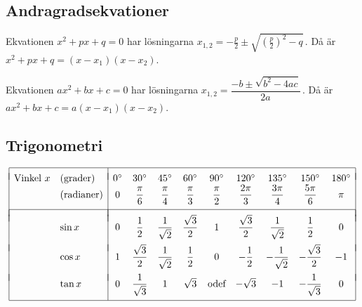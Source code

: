 \documentclass[a4paper]{article}
\begin{document}
\subsection*{Andragradsekvationer}

Ekvationen $x^2+px+q=0$ har lösningarna
  $x_{1,2}=-\frac p2\pm\sqrt{\left(\frac p2\right)^2-q}$\,.
Då är $x^2+px+q=(x-x_1)(x-x_2)$.

\medskip %
Ekvationen $ax^2+bx+c=0$ har lösningarna
$x_{1,2}=\dfrac{-b\pm\sqrt{b^2-4ac}}{2a}$\,.
Då är $ax^2+bx+c=a(x-x_1)(x-x_2)$.


\subsection*{Trigonometri}
\begin{equation*}
  \begin{array}{|ll|ccccccccc|}
    \hline
    &&&&&&&&&&\\*[-7pt]
    \text{Vinkel }x&(\text{grader})&
    0^\circ&30^\circ&45^\circ&60^\circ&90^\circ&
    120^\circ&135^\circ&150^\circ&180^\circ\\
    &(\text{radianer})&
    0&\dfrac\pi6&\dfrac\pi4&\dfrac\pi3&\dfrac\pi2&
    \dfrac{2\pi}3&\dfrac{3\pi}4&\dfrac{5\pi}6&\pi\\*[3pt]
    &&&&&&&&&&\\*[-7pt]
    \hline
    &&&&&&&&&&\\*[-7pt]
    &\sin x&0&\dfrac12&\dfrac1{\sqrt2}&\dfrac{\sqrt3}2&1&
    \dfrac{\sqrt3}2&\dfrac1{\sqrt2}&\dfrac12&0\\*[3pt]
    &&&&&&&&&&\\*[-7pt]
    &\cos x&1&\dfrac{\sqrt3}2&\dfrac1{\sqrt2}&\dfrac12&0&
    -\dfrac12&-\dfrac1{\sqrt2}&-\dfrac{\sqrt3}2&-1\\*[3pt]
    &&&&&&&&&&\\*[-7pt]
    &\tan x&0&\dfrac1{\sqrt3}&1&\sqrt3&\mbox{odef}&
    -\sqrt3&-1&-\dfrac1{\sqrt3}&0\\*[10pt]
    \hline
  \end{array}
\end{equation*}
\end{document}
